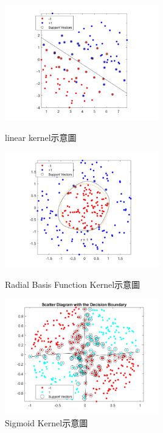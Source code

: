 \begin{figure}[H]
	\centerline{\includegraphics[height=5cm]{pic/linear kernel.png}}
	\caption{linear kernel示意圖}
	\label{fig:linear kernel}

	\centerline{\includegraphics[height=5cm]{pic/Radial Basis Function Kernel.png}}
	\caption{Radial Basis Function Kernel示意圖}
	\label{fig:Radial Basis}

	\centerline{\includegraphics[height=5cm]{pic/Sigmoid Kernel.png}}
	\caption{Sigmoid Kernel示意圖}
	\label{Sigmoid Kernel}
\end{figure}
